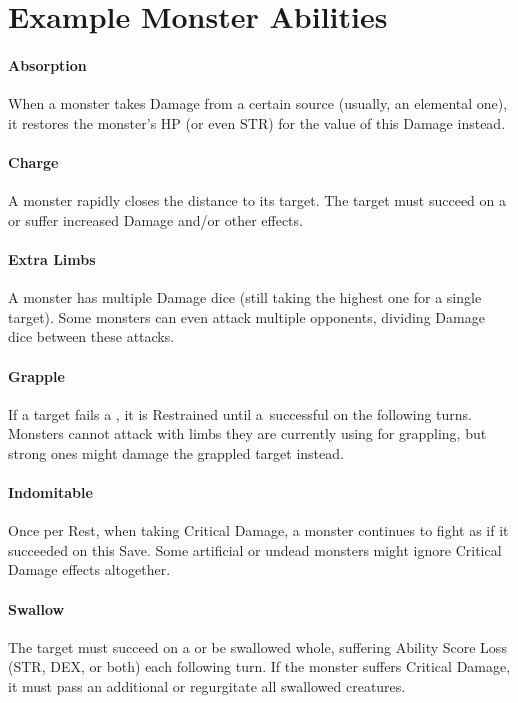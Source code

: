 \documentclass[itdr/core]{subfiles}
\begin{document}
\vfill
\break

\section{Example Monster Abilities}

\paragraph{Absorption}
When a monster takes Damage from a certain source (usually, an elemental one), it restores the monster's HP (or even STR) for the value of this Damage instead.\tight

\vfill
\paragraph{Charge}
A monster rapidly closes the distance to its target. The target must succeed on a  or suffer increased Damage and/or other effects.\tight

\vfill
\paragraph{Extra Limbs}
A monster has multiple Damage dice (still taking the highest one for a single target). Some monsters can even attack multiple opponents, dividing Damage dice between these attacks.

\vfill
\paragraph{Grapple}
If a target fails a , it is Restrained until a~successful  on the following turns. Monsters cannot attack with limbs they are currently using for grappling, but strong ones might damage the grappled target instead.

\vfill
\paragraph{Indomitable}
Once per Rest, when taking Critical Damage, a monster continues to fight as if it succeeded on this Save. Some artificial or undead monsters might ignore Critical Damage effects altogether.

\vfill
\paragraph{Swallow}
The target must succeed on a  or be swallowed whole, suffering Ability Score Loss (STR, DEX, or both) each following turn. If the monster suffers Critical Damage, it must pass an additional  or regurgitate all swallowed creatures.
\end{document}
